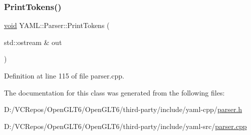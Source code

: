 \mbox{\label{class_y_a_m_l_1_1_parser_abca395895c919ccbd15fb042858f8ae5}} 
\subsubsection{\texorpdfstring{PrintTokens()}{PrintTokens()}}
{\footnotesize\ttfamily \mbox{\hyperlink{glad_8h_a950fc91edb4504f62f1c577bf4727c29}{void}} Y\+A\+M\+L\+::\+Parser\+::\+Print\+Tokens (\begin{DoxyParamCaption}\item[{std\+::ostream \&}]{out }\end{DoxyParamCaption})}



Definition at line 115 of file parser.\+cpp.



The documentation for this class was generated from the following files\+:\begin{DoxyCompactItemize}
\item 
D\+:/\+V\+C\+Repos/\+Open\+G\+L\+T6/\+Open\+G\+L\+T6/third-\/party/include/yaml-\/cpp/\mbox{\hyperlink{parser_8h}{parser.\+h}}\item 
D\+:/\+V\+C\+Repos/\+Open\+G\+L\+T6/\+Open\+G\+L\+T6/third-\/party/include/yaml-\/src/\mbox{\hyperlink{parser_8cpp}{parser.\+cpp}}\end{DoxyCompactItemize}
